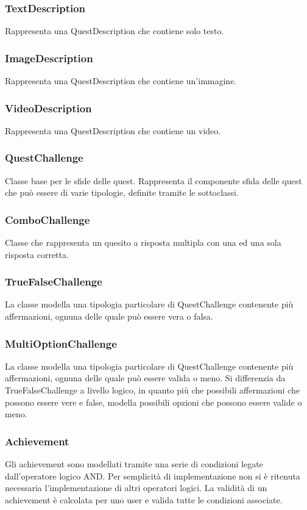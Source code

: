 {{\subsubsection{TextDescription} Rappresenta una QuestDescription che contiene solo testo.
\subsubsection{ImageDescription} Rappresenta una QuestDescription che contiene un'immagine.
\subsubsection{VideoDescription} Rappresenta una QuestDescription che contiene un video.
\subsubsection{QuestChallenge} Classe base per le sfide delle quest. Rappresenta il componente sfida delle quest che può essere di varie tipologie, definite tramite le sottoclassi.
\subsubsection{ComboChallenge} Classe che rappresenta un quesito a risposta multipla con una ed una sola risposta corretta.
\subsubsection{TrueFalseChallenge} La classe modella una tipologia particolare di QuestChallenge contenente più affermazioni, ognuna delle quale può essere vera o falsa.
\subsubsection{MultiOptionChallenge} La classe modella una tipologia particolare di QuestChallenge contenente più affermazioni, ognuna delle quale può essere valida o meno. Si differenzia da TrueFalseChallenge a livello logico, in quanto più che possibili affermazioni che possono essere vere e false, modella possibili opzioni che possono essere valide o meno.
\subsubsection{Achievement} Gli achievement sono modellati tramite una serie di condizioni legate dall’operatore logico AND. Per semplicità di implementazione non si è ritenuta necessaria l’implementazione di altri operatori logici. La validità di un achievement è calcolata per uno user e valida tutte le condizioni associate.
}}
